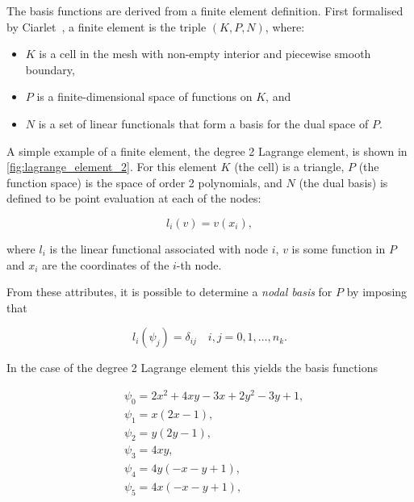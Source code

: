\documentclass[thesis]{subfiles}
\begin{document}
The basis functions are derived from a finite element definition.
First formalised by Ciarlet~\parencite{ciarletElement2002}, a finite element is the triple $(K, P, N)$, where:

\begin{itemize}
  \item $K$ is a cell in the mesh with non-empty interior and piecewise smooth boundary,
  \item $P$ is a finite-dimensional space of functions on $K$, and
  \item $N$ is a set of linear functionals that form a basis for the dual space of $P$.
\end{itemize}

A simple example of a finite element, the degree 2 Lagrange element, is shown in \cref{fig:lagrange_element_2}.
For this element $K$ (the cell) is a triangle, $P$ (the function space) is the space of order 2 polynomials, and $N$ (the dual basis) is defined to be point evaluation at each of the nodes:

\begin{equation*}
  l_i(v) = v(x_i),
\end{equation*}

where $l_i$ is the linear functional associated with node $i$, $v$ is some function in $P$ and $x_i$ are the coordinates of the $i$-th node.

From these attributes, it is possible to determine a \textit{nodal basis} for $P$ by imposing that

\begin{equation*}
  l_i(\psi_j) = \delta_{ij} \quad i, j = 0, 1, \dots, n_k.
\end{equation*}

In the case of the degree 2 Lagrange element this yields the basis functions

\begin{align*}
  &\psi_0 = 2x^2 + 4xy - 3x + 2y^2-3y+1, \\
  &\psi_1 = x(2x-1), \\
  &\psi_2 = y(2y-1), \\
  &\psi_3 = 4xy, \\
  &\psi_4 = 4y(-x-y+1), \\
  &\psi_5 = 4x(-x-y+1),
\end{align*}
\end{document}

